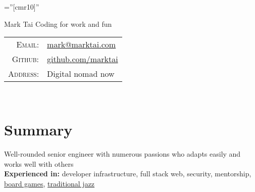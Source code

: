 \documentclass[a4paper,10pt]{article}
\begin{document}
\tracingall

\pagestyle{empty} %

\font\fb=''[cmr10]'' %



\begin{minipage}{0.7\textwidth}%
\par{
    {\fontsize{45}{50}\selectfont Mark Tai}
    \Large \hspace{.2em} Coding for work and fun
    }
\end{minipage}%
\hfill%
\begin{minipage}{0.3\textwidth}
\begin{tabular}{r|l}
    \textsc{Email:}     & \href{mailto:mark@marktai.com}{mark@marktai.com} \\
    \textsc{Github:}    & \href{https://www.github.com/marktai}{github.com/marktai}\\
    \textsc{Address:}   & Digital nomad now \\
\end{tabular}
\end{minipage} \\

\section{Summary}
\textbullet \hspace{.1em} Well-rounded senior engineer with numerous passions who adapts easily and works well with others \\
\textbullet \hspace{.1em} \textbf{Experienced in:} developer infrastructure, full stack web, security, mentorship, \href{http://mootropolis.marktai.com}{board games}, \href{http://marktai.com/s/16a8}{traditional jazz} \\
\end{document}
